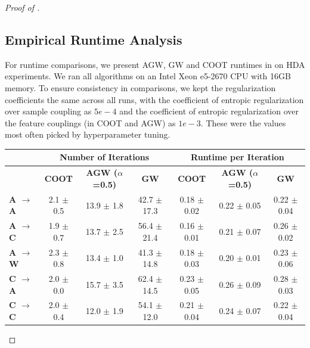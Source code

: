 \begin{proof}[Proof of ]
\subsection{Empirical Runtime Analysis} \label{subsec:chap5_runtime}
For runtime comparisons, we present AGW, GW and COOT runtimes in 
on HDA experiments. We ran all algorithms on an Intel Xeon e5-2670 CPU with 16GB memory.
To ensure consistency in comparisons, we kept the regularization coefficients the same across
all runs, with the coefficient of entropic regularization over sample coupling as $5e-4$ and
the coefficient of entropic regularization over the feature couplings (in COOT and AGW) as $1e-3$.
These were the values most often picked by hyperparameter tuning.

\begin{table}[t]
\small
\begin{tabular}{@{}lccc|ccc@{}}
\toprule
                           & \multicolumn{3}{c|}{\textbf{Number of Iterations}}                      & \multicolumn{3}{c}{\textbf{Runtime per Iteration}}                     \\ \midrule
                           & \textbf{COOT}        & \textbf{AGW ($\alpha$=0.5)} & \textbf{GW}           & \textbf{COOT}        & \textbf{AGW ($\alpha$=0.5)} & \textbf{GW}          \\
\textbf{A $\rightarrow$ A} & 2.1 $\pm$ 0.5               & 13.9 $\pm$ 1.8              & 42.7 $\pm$ 17.3          & 0.18 $\pm$ 0.02         & 0.22 $\pm$ 0.05             & 0.22 $\pm$ 0.04         \\
\textbf{A $\rightarrow$ C} & 1.9 $\pm$ 0.7               & 13.7 $\pm$ 2.5              & 56.4 $\pm$ 21.4          & 0.16 $\pm$ 0.01         & 0.21 $\pm$ 0.07             & 0.26 $\pm$ 0.02         \\
\textbf{A $\rightarrow$ W} & 2.3 $\pm$ 0.8               & 13.4 $\pm$ 1.0              &41.3 $\pm$ 14.8          & 0.18 $\pm$ 0.03         & 0.20 $\pm$ 0.01            & 0.23 $\pm$ 0.06        \\
\textbf{C $\rightarrow$ A} & 2.0 $\pm$ 0.0               & 15.7 $\pm$ 3.5              & 62.4 $\pm$ 14.5         & 0.23 $\pm$ 0.05         & 0.26 $\pm$ 0.09             & 0.28 $\pm$ 0.03         \\
\textbf{C $\rightarrow$ C} & 2.0 $\pm$ 0.4               & 12.0 $\pm$ 1.9              & 54.1 $\pm$ 12.0         & 0.21 $\pm$ 0.04         & 0.24 $\pm$ 0.07             & 0.22 $\pm$ 0.04         \\

\end{tabular}
\end{table}
\end{proof}
